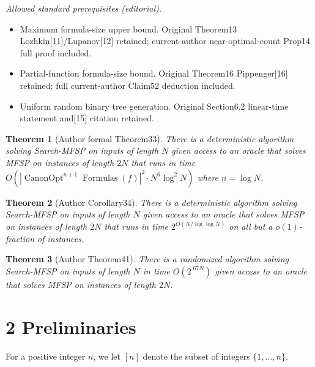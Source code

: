 \documentclass[10pt,a4paper]{article}
\newcommand{\Canon}[1]{\operatorname{CanonOpt}^{#1}\!\operatorname{Formulas}}
\newtheorem*{statementtheorem}{Theorem}
\begin{document}
\noindent\textit{Allowed standard prerequisites (editorial).}\begin{itemize}
\item Maximum formula-size upper bound. Original Theorem13 Lozhkin[11]/Lupanov[12] retained; current-author near-optimal-count Prop14 full proof included.
\item Partial-function formula-size bound. Original Theorem16 Pippenger[16] retained; full current-author Claim52 deduction included.
\item Uniform random binary tree generation. Original Section6.2 linear-time statement and[15] citation retained.
\end{itemize}\medskip
\begin{statementtheorem}[Author formal Theorem33]
There is a deterministic algorithm solving Search-MFSP on inputs of length $N$ given access to an oracle that solves MFSP on instances of length $2N$ that runs in time $O(|\Canon{n+1}(f)|^2\cdot N^6\log^2N)$ where $n=\log N$.
\end{statementtheorem}
\begin{statementtheorem}[Author Corollary34]
There is a deterministic algorithm solving Search-MFSP on inputs of length $N$ given access to an oracle that solves MFSP on instances of length $2N$ that runs in time $2^{O(N/\log\log N)}$ on all but a $o(1)$-fraction of instances.
\end{statementtheorem}
\begin{statementtheorem}[Author Theorem41]
There is a randomized algorithm solving Search-MFSP on inputs of length $N$ in time $O(2^{.67N})$ given access to an oracle that solves MFSP on instances of length $2N$.
\end{statementtheorem}

\section*{2 Preliminaries}
For a positive integer $n$, we let $[n]$ denote the subset of integers $\{1,\ldots,n\}$.
\end{document}
